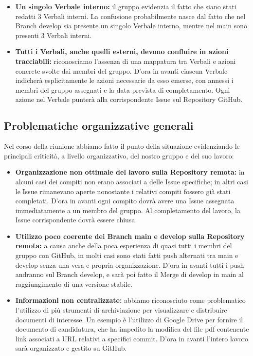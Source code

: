 \documentclass[a4paper,12pt]{article}
\begin{document}
\begin{itemize}
    \item \textbf{Un singolo Verbale interno:} il gruppo evidenzia il fatto che siano stati redatti 3 Verbali interni. La confusione probabilmente nasce dal fatto che nel Branch develop sia presente un singolo Verbale interno, mentre nel main sono presenti 3 Verbali interni. 
    \item \textbf{Tutti i Verbali, anche quelli esterni, devono confluire in azioni tracciabili:} riconosciamo l'assenza di una mappatura tra Verbali e azioni concrete svolte dai membri del gruppo. D'ora in avanti ciascun Verbale indicherà esplicitamente le azioni necessarie da esso emerse, con annessi i membri del gruppo assegnati e la data prevista di completamento. Ogni azione nel Verbale punterà alla corrispondente Issue sul Repository GitHub.
\end{itemize}

\subsection{Problematiche organizzative generali}
Nel corso della riunione abbiamo fatto il punto della situazione evidenziando le principali criticità, a livello organizzativo, del nostro gruppo e del suo lavoro:

\begin{itemize}
    \item \textbf{Organizzazione non ottimale del lavoro sulla Repository remota:} in alcuni casi dei compiti non erano associati a delle Issue specifiche; in altri casi le Issue rimanevano aperte nonostante i relativi compiti fossero già stati completati. D'ora in avanti ogni compito dovrà avere una Issue assegnata immediatamente a un membro del gruppo. Al completamento del lavoro, la Issue corrispondente dovrà essere chiusa.
    \item \textbf{Utilizzo poco coerente dei Branch main e develop sulla Repository remota:} a causa anche della poca esperienza di quasi tutti i membri del gruppo con GitHub, in molti casi sono stati fatti push alternati tra main e develop senza una vera e propria organizzazione. D'ora in avanti tutti i push andranno sul Branch develop, e sarà poi fatto il Merge di develop in main al raggiungimento di una versione stabile.
    \item \textbf{Informazioni non centralizzate:} abbiamo riconosciuto come problematico l'utilizzo di più strumenti di archiviazione per visualizzare e distribuire documenti di interesse. Un esempio è l'utilizzo di Google Drive per fornire il documento di candidatura, che ha impedito la modifica del file pdf contenente link associati a URL relativi a specifici commit. D'ora in avanti l'intero lavoro sarà organizzato e gestito su GitHub.
\end{itemize}
\end{document}
